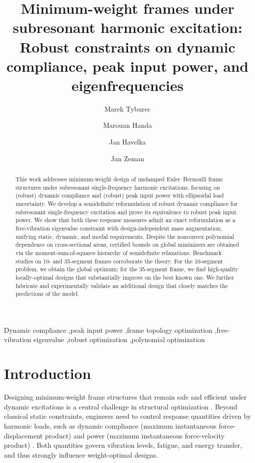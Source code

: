 \documentclass[preprint,3p]{elsarticle}
\title{Minimum-weight frames under subresonant harmonic excitation: Robust constraints on dynamic compliance, peak input power, and eigenfrequencies}
\author{Marek Tyburec}
\author{Marouan Handa}
\author{Jan Havelka}
\author{Jan Zeman}
\numberwithin{equation}{section}
\begin{document}
\begin{abstract}
This work addresses minimum-weight design of undamped Euler--Bernoulli frame structures under subresonant single-frequency harmonic excitations, focusing on (robust) dynamic compliance and (robust) peak input power with ellipsoidal load uncertainty. We develop a semidefinite reformulation of robust dynamic compliance for subresonant single‑frequency excitation and prove its equivalence to robust peak input power. We show that both these response measures admit an exact reformulation as a free-vibration eigenvalue constraint with design-independent mass augmentation, unifying static, dynamic, and modal requirements. Despite the nonconvex polynomial dependence on cross-sectional areas, certified bounds on global minimizers are obtained via the moment-sum-of-squares hierarchy of semidefinite relaxations. Benchmark studies on 10- and 35-segment frames corroborate the theory. For the 10-segment problem, we obtain the global optimum; for the 35-segment frame, we find high-quality locally-optimal designs that substantially improve on the best known one. We further fabricate and experimentally validate an additional design that closely matches the predictions of the model.
\end{abstract}

\begin{keyword}
Dynamic compliance \sep peak input power \sep frame topology optimization \sep free-vibration eigenvalue \sep robust optimization \sep polynomial optimization
\end{keyword}

\maketitle

\section{Introduction}

Designing minimum-weight frame structures that remain safe and efficient under dynamic excitations is a central challenge in structural optimization \citep{Jog2002,Niu2017,Silva2019}. Beyond classical static constraints, engineers need to control response quantities driven by harmonic loads, such as dynamic compliance (maximum instantaneous force-displacement product) \citep{Olhoff2014} and power (maximum instantaneous force-velocity product) \citep{Heidari2009optimization}. Both quantities govern vibration levels, fatigue, and energy transfer, and thus strongly influence weight-optimal designs.
\end{document}
